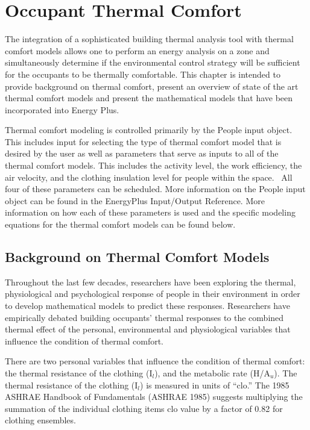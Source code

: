 \section{Occupant Thermal Comfort }\label{occupant-thermal-comfort}

The integration of a sophisticated building thermal analysis tool with thermal comfort models allows one to perform an energy analysis on a zone and simultaneously determine if the environmental control strategy will be sufficient for the occupants to be thermally comfortable. This chapter is intended to provide background on thermal comfort, present an overview of state of the art thermal comfort models and present the mathematical models that have been incorporated into Energy Plus.

Thermal comfort modeling is controlled primarily by the People input object. This includes input for selecting the type of thermal comfort model that is desired by the user as well as parameters that serve as inputs to all of the thermal comfort models. This includes the activity level, the work efficiency, the air velocity, and the clothing insulation level for people within the space.~ All four of these parameters can be scheduled. More information on the People input object can be found in the EnergyPlus Input/Output Reference. More information on how each of these parameters is used and the specific modeling equations for the thermal comfort models can be found below.

\subsection{Background on Thermal Comfort Models}\label{background-on-thermal-comfort-models}

Throughout the last few decades, researchers have been exploring the thermal, physiological and psychological response of people in their environment in order to develop mathematical models to predict these responses. Researchers have empirically debated building occupants' thermal responses to the combined thermal effect of the personal, environmental and physiological variables that influence the condition of thermal comfort.

There are two personal variables that influence the condition of thermal comfort: the thermal resistance of the clothing (I\(_{l}\)), and the metabolic rate (H/A\(_{u}\)). The thermal resistance of the clothing (I\(_{l}\)) is measured in units of ``clo.'' The 1985 ASHRAE Handbook of Fundamentals (ASHRAE 1985) suggests multiplying the summation of the individual clothing items clo value by a factor of 0.82 for clothing ensembles.

